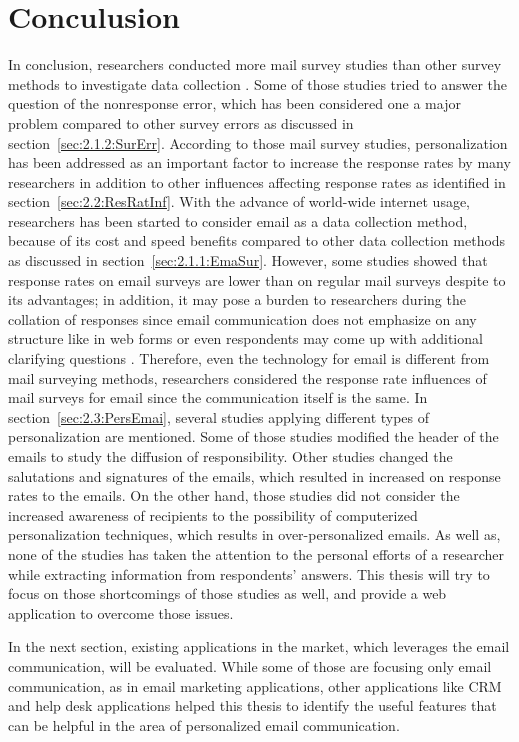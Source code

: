\section{Conculusion}
\label{sec:2.4:Conc}

In conclusion, researchers conducted more mail survey studies than other survey methods to investigate data collection \citep{Dillman1991}. Some of those studies tried to answer the question of the nonresponse error, which has been considered one a major problem compared to other survey errors as discussed in section~\ref{sec:2.1.2:SurErr}. According to those mail survey studies, personalization has been addressed as an important factor to increase the response rates by many researchers in addition to other influences affecting response rates as identified in section~\ref{sec:2.2:ResRatInf}. With the advance of world-wide internet usage, researchers has been started to consider email as a data collection method, because of its cost and speed benefits compared to other data collection methods as discussed in section~\ref{sec:2.1.1:EmaSur}. However, some studies showed that response rates on email surveys are lower than on regular mail surveys despite to its advantages; in addition, it may pose a burden to researchers during the collation of responses since email communication does not emphasize on any structure like in web forms or even respondents may come up with additional clarifying questions \citep{Selm2006}. Therefore, even the technology for email is different from mail surveying methods, researchers considered the response rate influences of mail surveys for email since the communication itself is the same. In section~\ref{sec:2.3:PersEmai}, several studies applying different types of personalization are mentioned. Some of those studies modified the header of the emails to study the diffusion of responsibility. Other studies changed the salutations and signatures of the emails, which resulted in increased on response rates to the emails. On the other hand, those studies did not consider the increased awareness of recipients to the possibility of computerized personalization techniques, which results in over-personalized emails. As well as, none of the studies has taken the attention to the personal efforts of a researcher while extracting information from respondents' answers. This thesis will try to focus on those shortcomings of those studies as well, and provide a web application to overcome those issues.
\vspace{1cm}

In the next section, existing applications in the market, which leverages the email communication, will be evaluated. While some of those are focusing only email communication, as in email marketing applications, other applications like \ac{CRM} and help desk applications helped this thesis to identify the useful features that can be helpful in the area of personalized email communication.  



